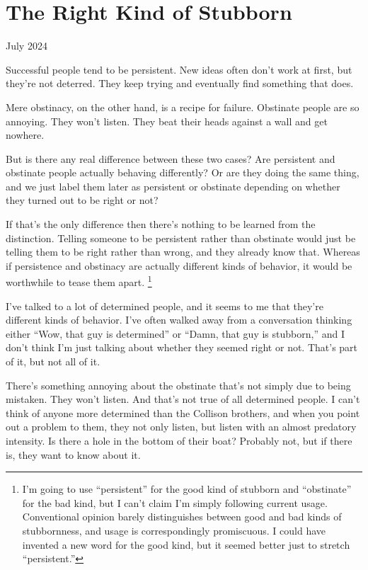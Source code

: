 \chapter{The Right Kind of Stubborn}

July 2024

Successful people tend to be persistent. New ideas often don't work at
first, but they're not deterred. They keep trying and eventually find
something that does.

Mere obstinacy, on the other hand, is a recipe for failure. Obstinate
people are so annoying. They won't listen. They beat their heads against
a wall and get nowhere.

But is there any real difference between these two cases? Are persistent
and obstinate people actually behaving differently? Or are they doing
the same thing, and we just label them later as persistent or obstinate
depending on whether they turned out to be right or not?

If that's the only difference then there's nothing to be learned from
the distinction. Telling someone to be persistent rather than obstinate
would just be telling them to be right rather than wrong, and they
already know that. Whereas if persistence and obstinacy are actually
different kinds of behavior, it would be worthwhile to tease them apart.
\footnote{I'm going to use ``persistent'' for the good kind of stubborn
and ``obstinate'' for the bad kind, but I can't claim I'm simply
following current usage. Conventional opinion barely distinguishes
between good and bad kinds of stubbornness, and usage is correspondingly
promiscuous. I could have invented a new word for the good kind, but it
seemed better just to stretch ``persistent.''}

I've talked to a lot of determined people, and it seems to me that
they're different kinds of behavior. I've often walked away from a
conversation thinking either ``Wow, that guy is determined'' or ``Damn,
that guy is stubborn,'' and I don't think I'm just talking about whether
they seemed right or not. That's part of it, but not all of it.

There's something annoying about the obstinate that's not simply due to
being mistaken. They won't listen. And that's not true of all determined
people. I can't think of anyone more determined than the Collison
brothers, and when you point out a problem to them, they not only
listen, but listen with an almost predatory intensity. Is there a hole
in the bottom of their boat? Probably not, but if there is, they want to
know about it.

